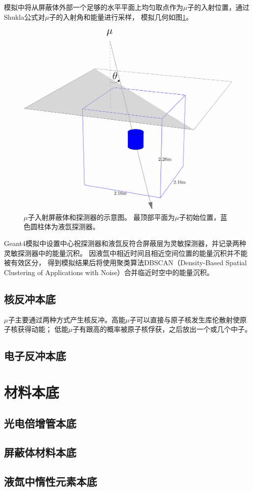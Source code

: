 模拟中将从屏蔽体外部一个足够的水平平面上均匀取点作为$\mu$子的入射位置，通过Shukla公式对$\mu$子的入射角和能量进行采样，
模拟几何如图\ref{fig:muon_inject}。

\begin{figure}
  \centering
  \includegraphics[width=0.6\linewidth]{figures/muon_inject.pdf}
  \caption{\label{fig:muon_inject} $\mu$子入射屏蔽体和探测器的示意图。
  最顶部平面为$\mu$子初始位置，蓝色圆柱体为液氙探测器。}
\end{figure}

Geant4模拟中设置中心祝探测器和液氙反符合屏蔽层为灵敏探测器，并记录两种灵敏探测器中的能量沉积。
因液氙中相近时间且相近空间位置的能量沉积并不能被有效区分，
得到模拟结果后将使用聚类算法DBSCAN（Density-Based Spatial Clustering of Applications with Noise）\cite{ester_density-based_1996,schubert_dbscan_2017}合并临近时空中的能量沉积。

\subsection{核反冲本底}
\label{sec:muon_nr}

$\mu$子主要通过两种方式产生核反冲。高能$\mu$子可以直接与原子核发生库伦散射使原子核获得动能；
低能$\mu$子有跟高的概率被原子核俘获，之后放出一个或几个中子。

\subsection{电子反冲本底}

\section{材料本底}

\subsection{光电倍增管本底}
\label{sec:pmt_background}

\subsection{屏蔽体材料本底}

\subsection{液氙中惰性元素本底}
